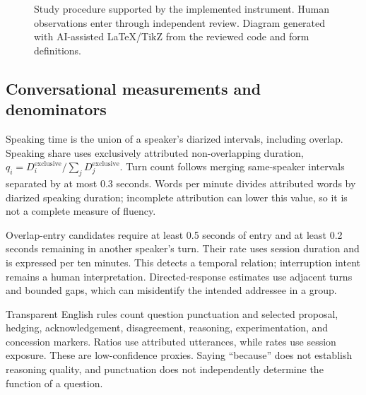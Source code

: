 \documentclass{article}
\begin{document}
\begin{figure}[ht]
\centering
{}
\caption{Study procedure supported by the implemented instrument. Human observations enter through independent review. Diagram generated with AI-assisted LaTeX/TikZ from the reviewed code and form definitions.}
\label{fig:procedure}
\end{figure}

\subsection{Conversational measurements and denominators}
Speaking time is the union of a speaker's diarized intervals, including overlap. Speaking share uses exclusively attributed non-overlapping duration, $q_i=D_i^{\mathrm{exclusive}}/\sum_jD_j^{\mathrm{exclusive}}$. Turn count follows merging same-speaker intervals separated by at most 0.3 seconds. Words per minute divides attributed words by diarized speaking duration; incomplete attribution can lower this value, so it is not a complete measure of fluency.

Overlap-entry candidates require at least 0.5 seconds of entry and at least 0.2 seconds remaining in another speaker's turn. Their rate uses session duration and is expressed per ten minutes. This detects a temporal relation; interruption intent remains a human interpretation. Directed-response estimates use adjacent turns and bounded gaps, which can misidentify the intended addressee in a group.

Transparent English rules count question punctuation and selected proposal, hedging, acknowledgement, disagreement, reasoning, experimentation, and concession markers. Ratios use attributed utterances, while rates use session exposure. These are low-confidence proxies. Saying ``because'' does not establish reasoning quality, and punctuation does not independently determine the function of a question.
\end{document}
